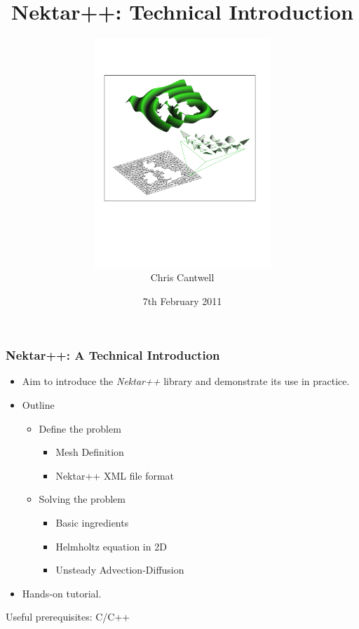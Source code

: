 \documentclass{beamer}
\title{Nektar++: Technical Introduction}
\author{\includegraphics[width=0.5\textwidth,trim=10mm 70mm 15mm 40mm,clip]
{title.pdf}\\Chris Cantwell}
\date{7th February 2011}
\numberwithin{figure}{section}
\numberwithin{equation}{section}
\begin{document}
\frame{\titlepage}


\begin{frame}
\frametitle{Nektar++: A Technical Introduction}
\begin{minipage}[c][0.8\textheight][t]{\linewidth}
\begin{itemize}
  \item Aim to introduce the \emph{Nektar++} library and demonstrate its use in
  practice.
  \item Outline
  \bigskip
  \begin{itemize}
  \item Define the problem
  \begin{itemize}
    \item Mesh Definition
    \item Nektar++ XML file format
  \end{itemize}
  \item Solving the problem
  \begin{itemize}
    \item Basic ingredients
    \item Helmholtz equation in 2D
    \item Unsteady Advection-Diffusion
  \end{itemize}
  \end{itemize}
  \bigskip
  \item Hands-on tutorial.
\end{itemize}
\bigskip
\bigskip
Useful prerequisites: C/C++
\end{minipage}
\end{frame}
\end{document}
